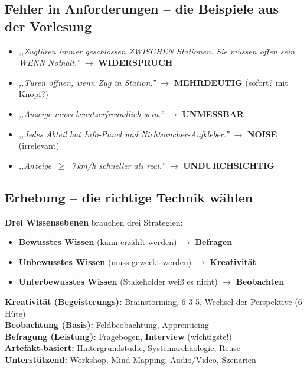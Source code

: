 \documentclass[11pt,a4paper]{article}
\begin{document}
\subsection{Fehler in Anforderungen -- die Beispiele aus der Vorlesung}

\begin{keyfacts}
\begin{itemize}
  \item \emph{,,Zugtüren immer geschlossen ZWISCHEN Stationen. Sie müssen offen sein WENN Nothalt.''} $\rightarrow$ \textbf{WIDERSPRUCH}
  \item \emph{,,Türen öffnen, wenn Zug in Station.''} $\rightarrow$ \textbf{MEHRDEUTIG} (sofort? mit Knopf?)
  \item \emph{,,Anzeige muss benutzerfreundlich sein.''} $\rightarrow$ \textbf{UNMESSBAR}
  \item \emph{,,Jedes Abteil hat Info-Panel und Nichtraucher-Aufkleber.''} $\rightarrow$ \textbf{NOISE} (irrelevant)
  \item \emph{,,Anzeige \,$\geq$\, 7\,km/h schneller als real.''} $\rightarrow$ \textbf{UNDURCHSICHTIG}
\end{itemize}
\end{keyfacts}

\subsection{Erhebung -- die richtige Technik wählen}

\begin{story}
\textbf{Drei Wissensebenen} brauchen drei Strategien:
\begin{itemize}
  \item \textbf{Bewusstes Wissen} (kann erzählt werden) $\rightarrow$ \textbf{Befragen}
  \item \textbf{Unbewusstes Wissen} (muss geweckt werden) $\rightarrow$ \textbf{Kreativität}
  \item \textbf{Unterbewusstes Wissen} (Stakeholder weiß es nicht) $\rightarrow$ \textbf{Beobachten}
\end{itemize}
\end{story}

\begin{keyfacts}
\textbf{Kreativität (Begeisterungs):} Brainstorming, 6-3-5, Wechsel der Perspektive (6 Hüte)\\
\textbf{Beobachtung (Basis):} Feldbeobachtung, Apprenticing\\
\textbf{Befragung (Leistung):} Fragebogen, \textbf{Interview} (wichtigste!)\\
\textbf{Artefakt-basiert:} Hintergrundstudie, Systemarchäologie, Reuse\\
\textbf{Unterstützend:} Workshop, Mind Mapping, Audio/Video, Szenarien
\end{keyfacts}
\end{document}
